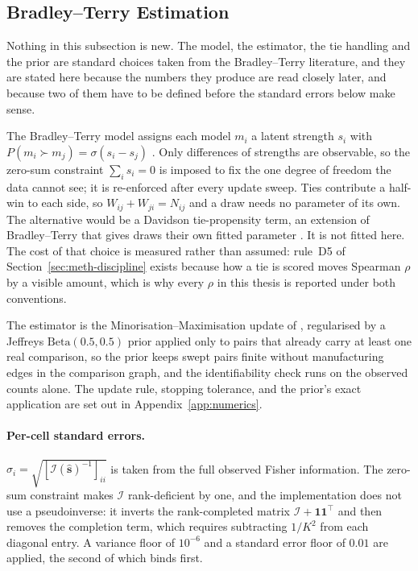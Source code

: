 \subsection{Bradley--Terry Estimation}\label{sec:meth-bt}

Nothing in this subsection is new. The model, the estimator, the tie
handling and the prior are standard choices taken from the
Bradley--Terry literature, and they are stated here because the
numbers they produce are read closely later, and because two of them
have to be defined before the standard errors below make sense.

The Bradley--Terry model assigns each model $m_i$ a latent strength
$s_i$ with $P(m_i \succ m_j) = \sigma(s_i - s_j)$
\parencite{bradley1952rank}. Only differences of strengths are
observable, so the zero-sum constraint $\sum_i s_i = 0$ is imposed to
fix the one degree of freedom the data cannot see; it is re-enforced
after every update sweep.
Ties contribute a half-win to each side, so $W_{ij} + W_{ji} = N_{ij}$
and a draw needs no parameter of its own. The alternative would be a
Davidson tie-propensity term, an extension of Bradley--Terry that gives
draws their own fitted parameter \parencite{davidson1970ties}. It is not fitted here. The cost of
that choice is measured rather than assumed: rule~D5 of
Section~\ref{sec:meth-discipline} exists because how a tie is scored
moves Spearman $\rho$ by a visible amount, which is why every $\rho$ in
this thesis is reported under both conventions.

The estimator is the Minorisation--Maximisation update of
\textcite{hunter2004mm}, regularised by a Jeffreys
$\mathrm{Beta}(0.5, 0.5)$ prior applied only to pairs that already
carry at least one real comparison, so the prior keeps swept pairs
finite without manufacturing edges in the comparison graph, and the
identifiability check runs on the observed counts alone. The update
rule, stopping tolerance, and the prior's exact application are set
out in Appendix~\ref{app:numerics}.

\paragraph{Per-cell standard errors.}
$\hat{\sigma}_i = \sqrt{[\mathcal{I}(\hat{\mathbf{s}})^{-1}]_{ii}}$ is
taken from the full observed Fisher information. The zero-sum
constraint makes $\mathcal{I}$ rank-deficient by one, and the
implementation does not use a pseudoinverse: it inverts the
rank-completed matrix $\mathcal{I} + \mathbf{1}\mathbf{1}^{\!\top}$ and
then removes the completion term, which requires subtracting $1/K^{2}$
from each diagonal entry. A variance floor of $10^{-6}$ and a standard
error floor of $0.01$ are applied, the second of which binds first.

